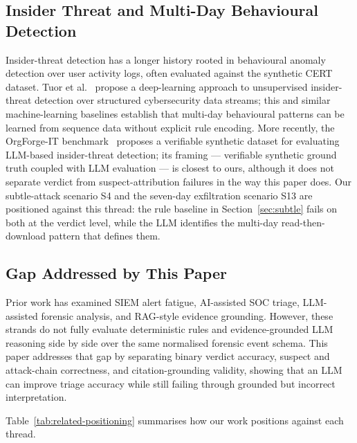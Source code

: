 \documentclass[conference]{IEEEtran}
\begin{document}
\subsection{Insider Threat and Multi-Day Behavioural Detection}

Insider-threat detection has a longer history rooted in behavioural anomaly detection over user activity logs, often evaluated against the synthetic CERT dataset. Tuor et al.~\cite{ref12} propose a deep-learning approach to unsupervised insider-threat detection over structured cybersecurity data streams; this and similar machine-learning baselines establish that multi-day behavioural patterns can be learned from sequence data without explicit rule encoding. More recently, the OrgForge-IT benchmark~\cite{ref13} proposes a verifiable synthetic dataset for evaluating LLM-based insider-threat detection; its framing --- verifiable synthetic ground truth coupled with LLM evaluation --- is closest to ours, although it does not separate verdict from suspect-attribution failures in the way this paper does. Our subtle-attack scenario S4 and the seven-day exfiltration scenario S13 are positioned against this thread: the rule baseline in Section~\ref{sec:subtle} fails on both at the verdict level, while the LLM identifies the multi-day read-then-download pattern that defines them.

\subsection{Gap Addressed by This Paper}

Prior work has examined SIEM alert fatigue, AI-assisted SOC triage, LLM-assisted forensic analysis, and RAG-style evidence grounding. However, these strands do not fully evaluate deterministic rules and evidence-grounded LLM reasoning side by side over the same normalised forensic event schema. This paper addresses that gap by separating binary verdict accuracy, suspect and attack-chain correctness, and citation-grounding validity, showing that an LLM can improve triage accuracy while still failing through grounded but incorrect interpretation.

Table~\ref{tab:related-positioning} summarises how our work positions against each thread.
\end{document}
